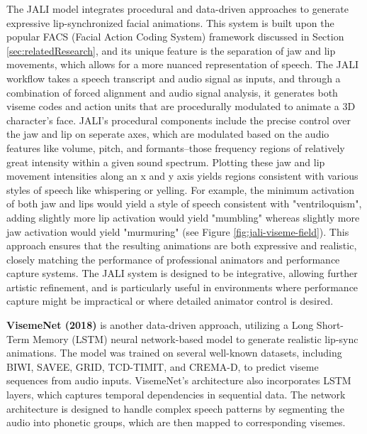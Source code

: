 \documentclass[12pt]{article}
\begin{document}
The JALI  model integrates procedural and data-driven approaches to generate expressive lip-synchronized facial animations. This system is built upon the popular FACS (Facial Action Coding System) framework \cite{Edwards2020jali-driven, Edwards2016} discussed in Section \ref{sec:relatedResearch}, and its unique feature is the separation of jaw and lip movements, which allows for a more nuanced representation of speech. The JALI workflow takes a speech transcript and audio signal as inputs, and through a combination of forced alignment and audio signal analysis, it generates both viseme codes and action units that are procedurally modulated to animate a 3D character's face.
JALI’s procedural components include the precise control over the jaw and lip on seperate axes, which are modulated based on the audio features like volume, pitch, and formants--those frequency regions of relatively great intensity within a given sound spectrum. Plotting these jaw and lip movement intensities along an x and y axis yields regions consistent with various styles of speech like whispering or yelling. For example, the minimum activation of both jaw and lips would yield a style of speech consistent with "ventriloquism", adding slightly more lip activation would yield "mumbling" whereas slightly more jaw activation would yield "murmuring" (see Figure \ref{fig:jali-viseme-field}). This approach ensures that the resulting animations are both expressive and realistic, closely matching the performance of professional animators and performance capture systems. The JALI system is designed to be integrative, allowing further artistic refinement, and is particularly useful in environments where performance capture might be impractical or where detailed animator control is desired.

\textbf{VisemeNet (2018)} \cite{Zhou2018visemenet} is another data-driven approach, utilizing a Long Short-Term Memory (LSTM) neural network-based model to generate realistic lip-sync animations. The model was trained on several well-known datasets, including BIWI, SAVEE, GRID, TCD-TIMIT, and CREMA-D, to predict viseme sequences from audio inputs. VisemeNet’s architecture also incorporates LSTM layers, which captures temporal dependencies in sequential data. The network architecture is designed to handle complex speech patterns by segmenting the audio into phonetic groups, which are then mapped to corresponding visemes. 
\end{document}
